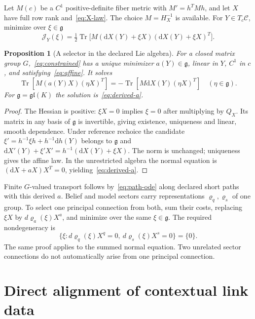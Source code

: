\documentclass[11pt]{article}
\newtheorem{proposition}[theorem]{Proposition}
\newcommand{\Tr}{\operatorname{Tr}}
\newcommand{\dd}{\mathrm d}
\newcommand{\C}{\mathcal C}
\begin{document}
Let $M(c)$ be a $C^1$ positive-definite fiber metric with $M'=h^TMh$, and let $X$ have full row rank and~\eqref{eq:X-law}. The choice $M=H_X^{-1}$ is available. For $Y\in T_c\C$, minimize over $\xi\in\mathfrak g$
\begin{equation}
 \mathcal J_Y(\xi)=\tfrac12\Tr\bigl[M(\dd X(Y)+\xi X)
                            (\dd X(Y)+\xi X)^T\bigr].
 \label{eq:constrained}
\end{equation}
\begin{proposition}[A selector in the declared Lie algebra]
For a closed matrix group $G$,~\eqref{eq:constrained} has a unique minimizer $a(Y)\in\mathfrak g$, linear in $Y$, $C^1$ in $c$, and satisfying~\eqref{eq:affine}. It solves
\begin{equation}
 \Tr[M(a(Y)X)(\eta X)^T]
 =-\Tr[M\dd X(Y)(\eta X)^T]\quad(\eta\in\mathfrak g).
 \label{eq:group-normal}
\end{equation}
For $\mathfrak g=\mathfrak{gl}(K)$ the solution is~\eqref{eq:derived-a}.
\end{proposition}
\begin{proof}
The Hessian is positive: $\xi X=0$ implies $\xi=0$ after multiplying by $Q_X$. Its matrix in any basis of $\mathfrak g$ is invertible, giving existence, uniqueness and linear, smooth dependence. Under reference rechoice the candidate $\xi'=h^{-1}\xi h+h^{-1}\dd h(Y)$ belongs to $\mathfrak g$ and $\dd X'(Y)+\xi'X'=h^{-1}(\dd X(Y)+\xi X)$. The norm is unchanged; uniqueness gives the affine law. In the unrestricted algebra the normal equation is $(\dd X+aX)X^T=0$, yielding~\eqref{eq:derived-a}.
\end{proof}

Finite $G$-valued transport follows by~\eqref{eq:path-ode} along declared short paths with this derived $a$. Belief and model sectors carry representations $\varrho_q,\varrho_s$ of one group. To select one principal connection from both, sum their costs, replacing $\xi X$ by $d\varrho_a(\xi)X^a$, and minimize over the same $\xi\in\mathfrak g$. The required nondegeneracy is
\begin{equation}
 \{\xi:d\varrho_q(\xi)X^q=0,
       \ d\varrho_s(\xi)X^s=0\}=\{0\}.
\end{equation}
The same proof applies to the summed normal equation. Two unrelated sector connections do not automatically arise from one principal connection.

\section{Direct alignment of contextual link data}
\label{sec:alignment}
\end{document}
